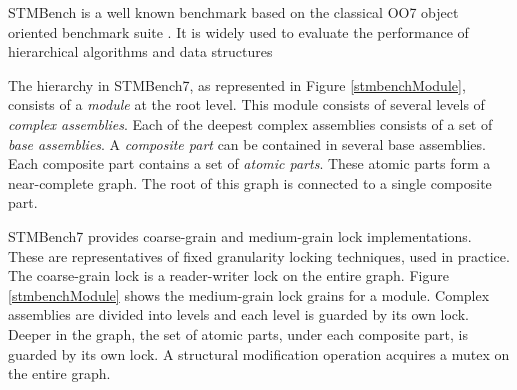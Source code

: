 STMBench is a well known benchmark based on the classical OO7 object oriented benchmark suite \cite{CareyDN93}. It is widely used to evaluate the performance of hierarchical algorithms and data structures \cite{prokopec_renaissance_2019,vale_pot_2016, felber_hardware_2016, carvalho_optimizing_2016, kim_scheduling_2015,filipe_nested_2015,rito_props_2014,kalikar2016domlock,anjuMID,FlexiGran2024,KalikarN18,GaneshKN18,liu_unleashing_2014} 

The hierarchy in STMBench7, as represented in Figure \ref{stmbenchModule}, consists of a \emph{module} at the root level. This module consists of several levels of \emph{complex assemblies}. 
Each of the deepest complex assemblies consists of a set of \emph{base assemblies}. 
A \emph{composite part} can be contained in several base assemblies. 
Each composite part contains a set of \emph{atomic parts}. 
These atomic parts form a near-complete graph. 
The root of this graph is connected to a single composite part.

STMBench7 provides coarse-grain  and medium-grain lock implementations. These are representatives of fixed granularity locking techniques, used in practice.  
The coarse-grain lock is a reader-writer lock on the entire graph. 
Figure  \ref{stmbenchModule} shows the medium-grain lock grains for a module. 
Complex assemblies are divided into levels and each level is guarded by its own lock.
Deeper in the graph, the set of atomic parts, under each composite part, is guarded by its own lock.
A structural modification operation acquires a mutex on the entire graph.


